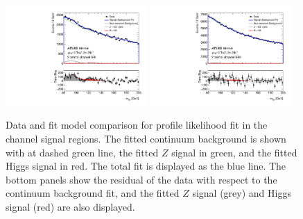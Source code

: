 \begin{figure}[htbp]
  \centering
 \includegraphics[width=0.48\textwidth]{figures/VBF/unblind_testVBF_ICHEP_2cen_SRI.pdf}
 \includegraphics[width=0.48\textwidth]{figures/VBF/unblind_testVBF_ICHEP_2cen_SRII.pdf}\\
\caption{Data and fit model comparison for profile likelihood fit in the \twocentral channel signal regions.  The fitted continuum background is shown with at  dashed green line, the fitted $Z$ signal in green, and the fitted Higgs signal in red.  The total fit is displayed as the blue line.  The bottom panels show the residual of the data with respect to the continuum background fit, and the fitted $Z$ signal (grey) and Higgs signal (red) are also displayed. }
  \label{fig:vbf-higgsfit_2cen}
\end{figure}

